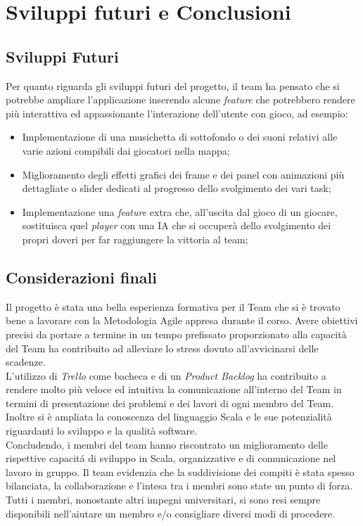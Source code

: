 \chapter{Sviluppi futuri e Conclusioni}

\section{Sviluppi Futuri}
Per quanto riguarda gli sviluppi futuri del progetto, il team ha pensato che si potrebbe ampliare l'applicazione inserendo alcune \textit{feature} che potrebbero rendere più interattiva ed appassionante l'interazione dell'utente con gioco, ad esempio:
\begin{itemize}
    \item Implementazione di una musichetta di sottofondo o dei suoni relativi alle varie azioni compibili dai giocatori nella mappa;
    \item Miglioramento degli effetti grafici dei frame e dei panel con animazioni pi\`u dettagliate o slider dedicati al progresso dello svolgimento dei vari task;
    \item Implementazione una \textit{feature} extra che, all'uscita dal gioco di un giocare, sostituisca quel \textit{player} con una IA che si occuper\`a dello svolgimento dei propri doveri per far raggiungere la vittoria al team;
\end{itemize}
 
\section{Considerazioni finali}
Il progetto \`e stata una bella esperienza formativa per il Team che si \`e trovato bene a lavorare con la Metodologia Agile appresa durante il corso. Avere obiettivi precisi da portare a termine in un tempo prefissato proporzionato alla capacit\`a del Team ha contribuito ad alleviare lo stress dovuto all'avvicinarsi delle scadenze.\\
L'utilizzo di \textit{Trello} come bacheca e di un \textit{Product Backlog} ha contribuito a rendere molto pi\`u veloce ed intuitiva la comunicazione all'interno del Team in termini di presentazione dei problemi e dei lavori di ogni membro del Team.\\
Inoltre si \`e ampliata la conoscenza del linguaggio Scala e le sue potenzialit\`a riguardanti lo sviluppo e la qualit\`a software.\\
Concludendo, i membri del team hanno riscontrato un miglioramento delle rispettive capacit\'a di sviluppo in Scala, organizzative e di comunicazione nel lavoro in gruppo. Il team evidenzia che la suddivisione dei compiti \`e stata spesso bilanciata, la collaborazione e l'intesa tra i membri sono state un punto di forza. Tutti i membri, nonostante altri impegni universitari, si sono resi
sempre disponibili nell'aiutare un membro e/o consigliare diversi modi di procedere.